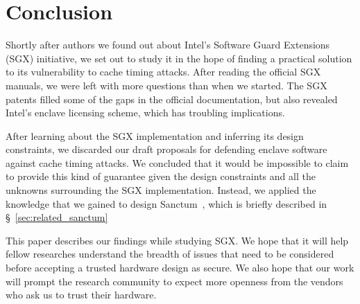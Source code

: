 \section{Conclusion}

Shortly after authors we found out about Intel's Software Guard Extensions
(SGX) initiative, we set out to study it in the hope of finding a practical
solution to its vulnerability to cache timing attacks. After reading the
official SGX manuals, we were left with more questions than when we started.
The SGX patents filled some of the gaps in the official documentation, but also
revealed Intel's enclave licensing scheme, which has troubling implications.

After learning about the SGX implementation and inferring its design
constraints, we discarded our draft proposals for defending enclave software
against cache timing attacks. We concluded that it would be impossible to claim
to provide this kind of guarantee given the design constraints and all the
unknowns surrounding the SGX implementation. Instead, we applied the knowledge
that we gained to design Sanctum~\cite{costan2015sanctum}, which is briefly
described in \S~\ref{sec:related_sanctum}

This paper describes our findings while studying SGX. We hope that it will help
fellow researches understand the breadth of issues that need to be considered
before accepting a trusted hardware design as secure. We also hope that our
work will prompt the research community to expect more openness from the
vendors who ask us to trust their hardware.
